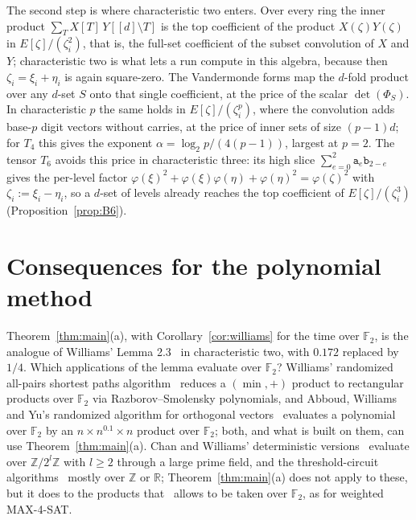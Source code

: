 \documentclass[11pt]{article}
\theoremstyle{definition}
\theoremstyle{remark}
\newcommand{\Z}{\mathbb{Z}}
\newcommand{\F}{\mathbb{F}}
\begin{document}
The second step is where characteristic two enters. Over every ring the inner product $\sum_TX[T]\,Y[[d]\setminus T]$ is the top coefficient of the product $X(\zeta)Y(\zeta)$ in $E[\zeta]/(\zeta_i^2)$, that is, the full-set coefficient of the subset convolution of $X$ and $Y$; characteristic two is what lets a run compute in this algebra, because then $\zeta_i=\xi_i+\eta_i$ is again square-zero. The Vandermonde forms map the $d$-fold product over any $d$-set $S$ onto that single coefficient, at the price of the scalar $\det(\Phi_S)$. In characteristic $p$ the same holds in $E[\zeta]/(\zeta_i^p)$, where the convolution adds base-$p$ digit vectors without carries, at the price of inner sets of size $(p-1)d$; for $T_4$ this gives the exponent $\alpha=\log_2p/(4(p-1))$, largest at $p=2$. The tensor $T_6$ avoids this price in characteristic three: its high slice $\sum_{e=0}^2\mathtt a_e\mathtt b_{2-e}$ gives the per-level factor $\varphi(\xi)^2+\varphi(\xi)\varphi(\eta)+\varphi(\eta)^2=\varphi(\zeta)^2$ with $\zeta_i:=\xi_i-\eta_i$, so a $d$-set of levels already reaches the top coefficient of $E[\zeta]/(\zeta_i^3)$ (Proposition~\ref{prop:B6}).

\section{Consequences for the polynomial method}\label{sec:polymethod}

Theorem~\ref{thm:main}(a), with Corollary~\ref{cor:williams} for the time over $\F_2$, is the analogue of Williams' Lemma 2.3~\cite{Wil14b} in characteristic two, with $0.172$ replaced by $1/4$. Which applications of the lemma evaluate over $\F_2$? Williams' randomized all-pairs shortest paths algorithm~\cite[Theorem~1.1]{Wil14a} reduces a $(\min,+)$ product to rectangular products over $\F_2$ via Razborov--Smolensky polynomials, and Abboud, Williams and Yu's randomized algorithm for orthogonal vectors~\cite[Lemma~2.2]{AWY15} evaluates a polynomial over $\F_2$ by an $n\times n^{0.1}\times n$ product over $\F_2$; both, and what is built on them, can use Theorem~\ref{thm:main}(a). Chan and Williams' deterministic versions~\cite{CW16} evaluate over $\Z/2^l\Z$ with $l\ge2$ through a large prime field, and the threshold-circuit algorithms~\cite{Wil14b,ACW16} mostly over $\Z$ or $\mathbb R$; Theorem~\ref{thm:main}(a) does not apply to these, but it does to the products that~\cite{ACW16} allows to be taken over $\F_2$, as for weighted MAX-4-SAT.
\end{document}

